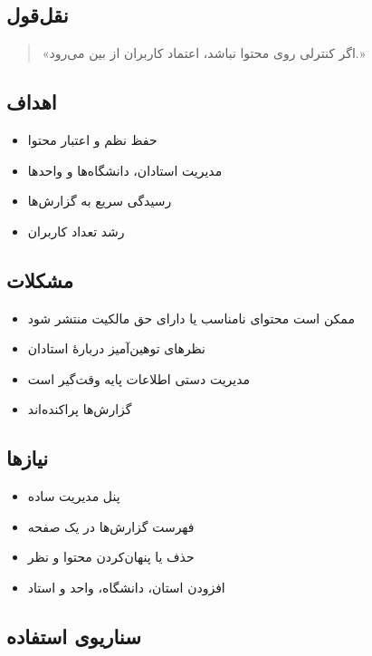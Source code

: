 \documentclass[12pt, a4paper]{article}
\begin{document}
\subsection{نقل‌قول}

\begin{quote}
«اگر کنترلی روی محتوا نباشد، اعتماد کاربران از بین می‌رود.»
\end{quote}

\subsection{اهداف}

\begin{itemize}
\tightlist
\item
  حفظ نظم و اعتبار محتوا
\item
  مدیریت استادان، دانشگاه‌ها و واحدها
\item
  رسیدگی سریع به گزارش‌ها
\item
  رشد تعداد کاربران
\end{itemize}

\subsection{مشکلات}

\begin{itemize}
\tightlist
\item
  ممکن است محتوای نامناسب یا دارای حق مالکیت منتشر شود
\item
  نظرهای توهین‌آمیز دربارهٔ استادان
\item
  مدیریت دستی اطلاعات پایه وقت‌گیر است
\item
  گزارش‌ها پراکنده‌اند
\end{itemize}

\subsection{نیازها}

\begin{itemize}
\tightlist
\item
  پنل مدیریت ساده
\item
  فهرست گزارش‌ها در یک صفحه
\item
  حذف یا پنهان‌کردن محتوا و نظر
\item
  افزودن استان، دانشگاه، واحد و استاد
\end{itemize}

\subsection{سناریوی استفاده}
\end{document}
